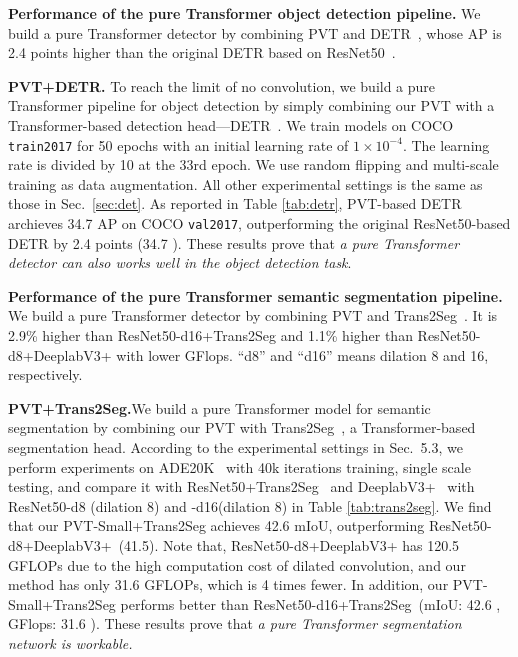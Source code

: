 \documentclass[10pt,twocolumn,letterpaper]{article}
\begin{document}
\begin{table}[t]
    \centering
    \renewcommand\arraystretch{ 1.0}
    \setlength{\tabcolsep}{1.4mm}
    \footnotesize
    
     
    \caption{\textbf{Performance of the pure Transformer object detection pipeline.} We build a pure Transformer detector by combining PVT and DETR~\cite{carion2020end}, whose AP is 2.4 points higher than the original DETR based on ResNet50~\cite{he2016deep}.}
    \label{tab:detr}
\end{table}
%
\noindent\textbf{PVT+DETR.} To reach the limit of no convolution, we build a pure Transformer pipeline for object detection by simply combining our PVT with a Transformer-based detection head---DETR~\cite{carion2020end}. We train models on COCO \texttt{train2017} for 50 epochs with an initial learning rate of $1\times 10^{-4}$. The learning rate is divided by 10 at the 33rd epoch. We use random flipping and multi-scale training as data augmentation. All other experimental settings is the same as those in Sec.~\ref{sec:det}. As reported in Table \ref{tab:detr}, PVT-based DETR archieves 34.7 AP on COCO \texttt{val2017}, outperforming the original ResNet50-based DETR by 2.4 points (34.7 ). These results prove that \emph{a pure Transformer detector can also works well 
%
in the object detection task}.


\begin{table}[t]
    \centering
    \footnotesize
    \renewcommand\arraystretch{ 1.0}
    \setlength{\tabcolsep}{1.3mm}
    
     
    \caption{\textbf{Performance of the pure Transformer semantic segmentation pipeline.} We build a pure Transformer detector by combining PVT and Trans2Seg~\cite{xie2021segmenting}. It is 2.9\% higher than ResNet50-d16+Trans2Seg and 1.1\% higher than ResNet50-d8+DeeplabV3+ with lower GFlops. ``d8'' and ``d16'' means dilation 8 and 16, respectively. }
    \label{tab:trans2seg}
\end{table}
\noindent\textbf{PVT+Trans2Seg.}We build a pure Transformer model for semantic segmentation by combining our PVT with Trans2Seg~\cite{xie2021segmenting}, a Transformer-based segmentation head.
According to the experimental settings in Sec.~5.3, we perform experiments on ADE20K~\cite{zhou2017scene} with 40k iterations training, single scale testing, and compare it with ResNet50+Trans2Seg~\cite{xie2021segmenting} and DeeplabV3+~\cite{chen2018encoder} with ResNet50-d8 (dilation 8) and -d16(dilation 8) in Table \ref{tab:trans2seg}. 
%
We find that our PVT-Small+Trans2Seg achieves 42.6 mIoU, outperforming ResNet50-d8+DeeplabV3+~(41.5).
Note that, ResNet50-d8+DeeplabV3+ has 120.5 GFLOPs due to the high computation cost of dilated convolution, and our method has only 31.6 GFLOPs, which is 4 times fewer.
In addition, our PVT-Small+Trans2Seg performs better than ResNet50-d16+Trans2Seg~(mIoU: 42.6 , GFlops: 31.6 ).
%
These results prove that \emph{a pure Transformer segmentation network is workable.}
%
\end{document}
